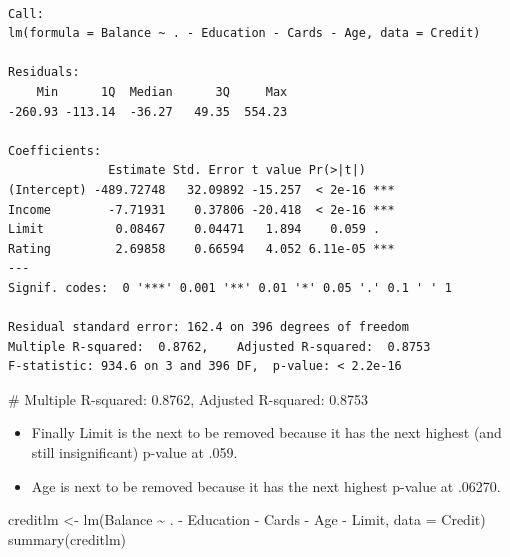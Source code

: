 \documentclass[
  letterpaper,
  DIV=11,
  numbers=noendperiod]{scrreprt}
\newenvironment{Shaded}{\begin{snugshade}}{\end{snugshade}}
\newcommand{\AttributeTok}[1]{\textcolor[rgb]{0.40,0.45,0.13}{#1}}
\newcommand{\CommentTok}[1]{\textcolor[rgb]{0.37,0.37,0.37}{#1}}
\newcommand{\FunctionTok}[1]{\textcolor[rgb]{0.28,0.35,0.67}{#1}}
\newcommand{\NormalTok}[1]{\textcolor[rgb]{0.00,0.23,0.31}{#1}}
\newcommand{\OtherTok}[1]{\textcolor[rgb]{0.00,0.23,0.31}{#1}}
\newcommand{\SpecialCharTok}[1]{\textcolor[rgb]{0.37,0.37,0.37}{#1}}
\begin{document}
\begin{verbatim}

Call:
lm(formula = Balance ~ . - Education - Cards - Age, data = Credit)

Residuals:
    Min      1Q  Median      3Q     Max 
-260.93 -113.14  -36.27   49.35  554.23 

Coefficients:
              Estimate Std. Error t value Pr(>|t|)    
(Intercept) -489.72748   32.09892 -15.257  < 2e-16 ***
Income        -7.71931    0.37806 -20.418  < 2e-16 ***
Limit          0.08467    0.04471   1.894    0.059 .  
Rating         2.69858    0.66594   4.052 6.11e-05 ***
---
Signif. codes:  0 '***' 0.001 '**' 0.01 '*' 0.05 '.' 0.1 ' ' 1

Residual standard error: 162.4 on 396 degrees of freedom
Multiple R-squared:  0.8762,    Adjusted R-squared:  0.8753 
F-statistic: 934.6 on 3 and 396 DF,  p-value: < 2.2e-16
\end{verbatim}

\begin{Shaded}
\begin{Highlighting}[]
\CommentTok{\# Multiple R{-}squared: 0.8762, Adjusted R{-}squared: 0.8753}
\end{Highlighting}
\end{Shaded}

\begin{itemize}
\item
  Finally Limit is the next to be removed because it has the next
  highest (and still insignificant) p-value at .059.
\item
  Age is next to be removed because it has the next highest p-value at
  .06270.
\end{itemize}

\begin{Shaded}
\begin{Highlighting}[]
\NormalTok{creditlm }\OtherTok{\textless{}{-}} \FunctionTok{lm}\NormalTok{(Balance }\SpecialCharTok{\textasciitilde{}}\NormalTok{ . }\SpecialCharTok{{-}}\NormalTok{ Education }\SpecialCharTok{{-}}\NormalTok{ Cards }\SpecialCharTok{{-}}\NormalTok{ Age }\SpecialCharTok{{-}}\NormalTok{ Limit, }\AttributeTok{data =}\NormalTok{ Credit)}
\FunctionTok{summary}\NormalTok{(creditlm)}
\end{Highlighting}
\end{Shaded}
\end{document}
